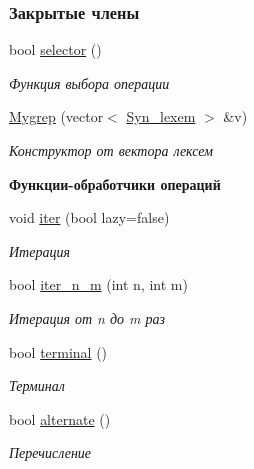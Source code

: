 \subsubsection*{Закрытые члены}
\begin{DoxyCompactItemize}
\item 
bool \hyperlink{class_mygrep_ac4293787424bbfe7be6d2585a5f40e9f}{selector} ()
\begin{DoxyCompactList}\small\item\em Функция выбора операции \end{DoxyCompactList}\item 
\hyperlink{class_mygrep_ae2ead57bb55a8e3625401169a9b693a7}{Mygrep} (vector$<$ \hyperlink{class_syn__lexem}{Syn\+\_\+lexem} $>$ \&v)
\begin{DoxyCompactList}\small\item\em Конструктор от вектора лексем \end{DoxyCompactList}\end{DoxyCompactItemize}
\begin{Indent}{\bf Функции-\/обработчики операций}\par
\begin{DoxyCompactItemize}
\item 
void \hyperlink{class_mygrep_ad893ffcdb0252a2724e5679bf24eeff7}{iter} (bool lazy=false)
\begin{DoxyCompactList}\small\item\em Итерация \end{DoxyCompactList}\item 
bool \hyperlink{class_mygrep_ac52eb295fdae462e39016b0e69bd75bc}{iter\+\_\+n\+\_\+m} (int n, int m)
\begin{DoxyCompactList}\small\item\em Итерация от n до m раз \end{DoxyCompactList}\item 
bool \hyperlink{class_mygrep_a0e3ee4dc08c04520c4b2af313cf6f9a3}{terminal} ()
\begin{DoxyCompactList}\small\item\em Терминал \end{DoxyCompactList}\item 
bool \hyperlink{class_mygrep_a43b5b9e7e2d0ccbee7f5ec0115f53952}{alternate} ()
\begin{DoxyCompactList}\small\item\em Перечисление \end{DoxyCompactList}\end{DoxyCompactItemize}
\end{Indent}
